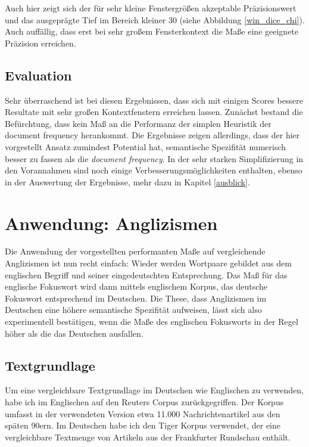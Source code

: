 \documentclass[11pt,numbers=noenddot]{scrartcl}
\begin{document}
Auch hier zeigt sich der für sehr kleine Fenstergrößen akzeptable Präzisionswert und das ausgeprägte Tief im Bereich kleiner 30 (siehe Abbildung \ref{win_dice_chi}). Auch auffällig, dass erst bei sehr großem Fensterkontext die Maße eine geeignete Präzision erreichen.


\subsection{Evaluation}

Sehr überraschend ist bei diesen Ergebnissen, dass sich mit einigen Scores bessere Resultate mit sehr großen Kontextfenstern erreichen lassen. Zunächst bestand die Befürchtung, dass kein Maß an die Performanz der simplen Heuristik der document frequency herankommt. Die Ergebnisse zeigen allerdings, dass der hier vorgestellt Ansatz zumindest Potential hat, semantische Spezifität numerisch besser zu fassen als die \emph{document frequency}. In der sehr starken Simplifizierung in den Vorannahmen sind noch einige Verbesserungsmöglichkeiten enthalten, ebenso in der Auswertung der Ergebnisse, mehr dazu in Kapitel \ref{ausblick}.

\section{Anwendung: Anglizismen}

Die Anwendung der vorgestellten performanten Maße auf vergleichende Anglizismen ist nun recht einfach: Wieder werden Wortpaare gebildet aus dem englischen Begriff und seiner eingedeutschten Entsprechung. Das Maß für das englische Fokuswort wird dann mittels englischem Korpus, das deutsche Fokuswort entsprechend im Deutschen. Die These, dass Anglizismen im Deutschen eine höhere semantische Spezifität aufweisen, lässt sich also experimentell bestätigen, wenn die Maße des englischen Fokusworts in der Regel höher als die das Deutschen ausfallen.

\subsection{Textgrundlage}

Um eine vergleichbare Textgrundlage im Deutschen wie Englischen zu verwenden, habe ich im Englischen auf den Reuters Corpus \citep{Lewis:2004:RNB:1005332.1005345} zurückgegriffen. Der Korpus umfasst in der verwendeten Version etwa 11.000 Nachrichtenartikel aus den späten 90ern.
Im Deutschen habe ich den Tiger Korpus \citep{Brants2004} verwendet, der eine vergleichbare Textmenge von Artikeln aus der Frankfurter Rundschau enthält.
\end{document}
